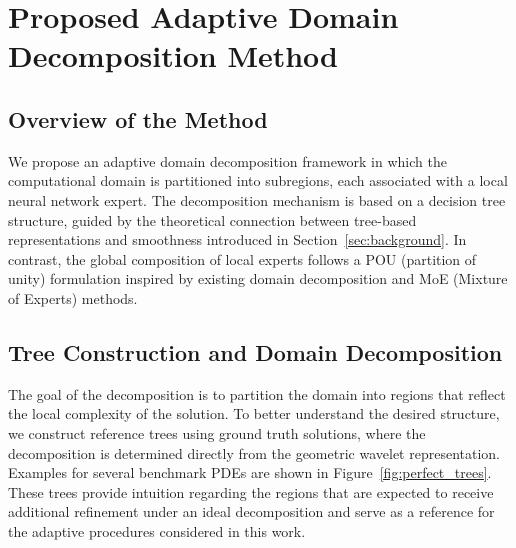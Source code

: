 \section{Proposed Adaptive Domain Decomposition Method}
\label{sec:method}

\subsection{Overview of the Method}

We propose an adaptive domain decomposition framework in which the computational
domain is partitioned into subregions, each associated with a local neural network
expert. The decomposition mechanism is based on a decision tree structure, guided by
the theoretical connection between tree-based representations and smoothness
introduced in Section~\ref{sec:background}. In contrast, the global composition
of local experts follows a  POU (partition of unity) formulation inspired by existing
domain decomposition and MoE (Mixture of Experts) methods.

\vspace{0.5em}

\subsection{Tree Construction and Domain Decomposition}
\label{sec:tree_construction}

The goal of the decomposition is to partition the domain into regions that
reflect the local complexity of the solution. To better understand the desired
structure, we construct reference trees using ground truth solutions,
where the decomposition is determined directly from the geometric wavelet
representation. Examples for several benchmark PDEs are shown in
Figure~\ref{fig:perfect_trees}. These trees provide intuition regarding the
regions that are expected to receive additional refinement under an ideal
decomposition and serve as a reference for the adaptive procedures considered
in this work.

